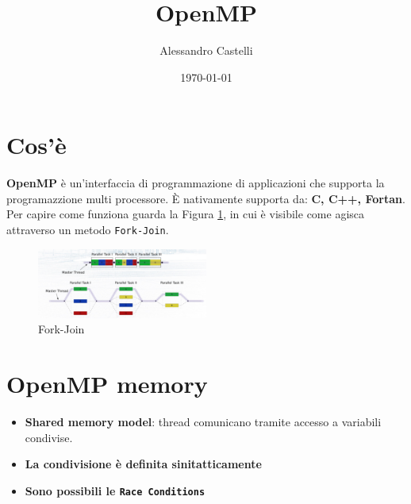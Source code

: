 \documentclass[a4paper, 12pt]{article}
\title{OpenMP}
\author{Alessandro Castelli}
\date{\today}
\begin{document}
\maketitle

\section{Cos'è}
\textbf{OpenMP} è un'interfaccia di programmazione di applicazioni che supporta la programazzione multi processore.
È nativamente supporta da: \textbf{C, C++, Fortan}.
Per capire come funziona guarda la Figura \ref{fig:ForkJoin}, in cui è visibile come agisca attraverso un metodo \texttt{Fork-Join}.

\begin{figure}[h]
    \centering
    \includegraphics[width=0.5\textwidth]{ForkJoin.png}
    \caption{Fork-Join}
    \label{fig:ForkJoin}
\end{figure} 

\section{OpenMP memory }
\begin{itemize}
    \item \textbf{Shared memory model}: thread comunicano tramite accesso a variabili condivise.
    \item \textbf{La condivisione è definita sinitatticamente}
    \item \textbf{Sono possibili le \texttt{Race Conditions}}
\end{itemize}
\end{document}
